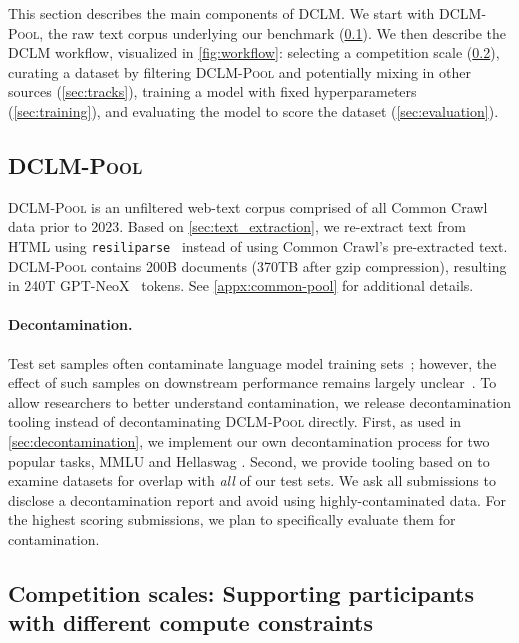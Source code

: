 This section describes the main components of \textsc{DCLM}.
We start with \textsc{DCLM-Pool}, the raw text corpus underlying our benchmark  (\ref{sec:rawpool}).
We then describe the \textsc{DCLM} workflow, visualized in \ref{fig:workflow}: selecting a competition scale (\ref{sec:scales}), curating a dataset by filtering \textsc{DCLM-Pool} and potentially mixing in other sources (\ref{sec:tracks}), training a model with fixed hyperparameters (\ref{sec:training}), and evaluating the model to score the dataset (\ref{sec:evaluation}).

\subsection{\textsc{DCLM-Pool}}\label{sec:rawpool}
\textsc{DCLM-Pool} is an unfiltered web-text corpus comprised of all Common Crawl~\citep{commoncrawl} data prior to 2023. Based on \ref{sec:text_extraction}, we re-extract text from HTML using \texttt{resiliparse}~\citep{resiliparse1,resiliparse2} instead of using Common Crawl's pre-extracted text.
\textsc{DCLM-Pool} contains 200B documents (370TB after gzip compression),  resulting in 240T GPT-NeoX~\citep{neox} tokens. See \ref{appx:common-pool} for additional details.

\paragraph{Decontamination.}
Test set samples often contaminate language model training sets~\citep{c4_ai2,Yang2023RethinkingBA,Elazar2023WhatsIM}; however, the effect of such samples on downstream performance remains largely unclear~\citep{Lee2021DeduplicatingTD,soldaini2024dolma,gpt4}. To allow researchers to better understand contamination, we release decontamination tooling instead of decontaminating \textsc{DCLM-Pool} directly. First, as used in \ref{sec:decontamination}, we implement our own decontamination process for two popular tasks, MMLU and Hellaswag \citep{mmlu, hellaswag}. Second, we provide tooling  based on \citet{Lee2021DeduplicatingTD} to examine datasets for overlap with \textit{all} of our test sets. We ask all submissions to disclose a decontamination report and avoid using highly-contaminated data. For the highest scoring submissions, we plan to specifically evaluate them for contamination.

\subsection{Competition scales: Supporting participants with different compute constraints}
\label{sec:scales}

